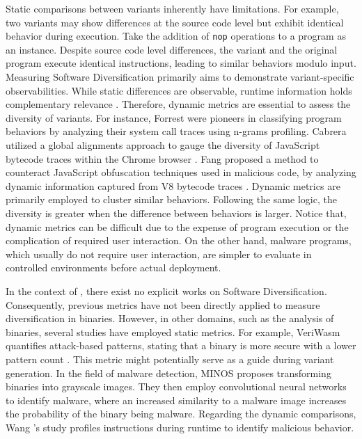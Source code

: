\begin{strategy}
    \label{trace_based}
    Static comparisons between variants inherently have limitations. 
    For example, two variants may show differences at the source code level but exhibit identical behavior during execution. 
    Take the addition of \texttt{nop} operations to a program as an instance. 
    Despite source code level differences, the variant and the original program execute identical instructions, leading to similar behaviors modulo input. 
    Measuring Software Diversification primarily aims to demonstrate variant-specific observabilities. 
    While static differences are observable, runtime information holds complementary relevance \cite{yao2018anomaly}. 
    Therefore, dynamic metrics are essential to assess the diversity of variants. 
    For instance, Forrest \etal \cite{forrest_system_call} were pioneers in classifying program behaviors by analyzing their system call traces using n-grams profiling. 
    Cabrera \etal utilized a global alignments approach to gauge the diversity of JavaScript bytecode traces within the Chrome browser \cite{STRAC}. 
    Fang \etal proposed a method to counteract JavaScript obfuscation techniques used in malicious code, by analyzing dynamic information captured from V8 bytecode traces \cite{8482113}. 
    Dynamic metrics are primarily employed to cluster similar behaviors.
    Following the same logic, the diversity is greater when the difference between behaviors is larger. 
    Notice that, dynamic metrics can be difficult due to the expense of program execution or the complication of required user interaction. 
    On the other hand, malware programs, which usually do not require user interaction, are simpler to evaluate in controlled environments before actual deployment.

\end{strategy}

In the context of \Wasm, there exist no explicit works on Software Diversification.
Consequently, previous metrics have not been directly applied to measure diversification in \Wasm binaries.
However, in other domains, such as the analysis of \Wasm binaries, several studies have employed static metrics.
For example, VeriWasm quantifies attack-based patterns, stating that a \Wasm binary is more secure with a lower pattern count \cite{veriwasm}.
This metric might potentially serve as a guide during variant generation.
In the field of malware detection, MINOS \cite{MINOS} proposes transforming \Wasm binaries into grayscale images.
They then employ convolutional neural networks to identify malware, where an increased similarity to a malware image increases the probability of the binary being malware.
Regarding the dynamic comparisons, Wang \etal's study \cite{SEISMIC} profiles \Wasm instructions during runtime to identify malicious behavior.


